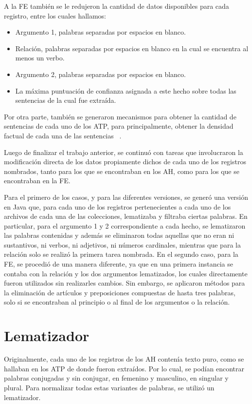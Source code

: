 A la FE tambi\'en se le redujeron la cantidad de datos disponibles para cada registro, entre los cuales hallamos:

\begin{itemize}
\item	Argumento 1, palabras separadas por espacios en blanco.
\item	Relaci\'on, palabras separadas por espacios en blanco en la cual se encuentra al menos un verbo.
\item	Argumento 2, palabras separadas por espacios en blanco.
\item	La m\'axima puntuaci\'on de confianza asignada a este hecho sobre todas las sentencias de la cual fue extra\'ida.
\end{itemize}

Por otra parte, tambi\'en se generaron mecanismos para obtener la cantidad de sentencias de cada uno de los ATP, para principalmente, obtener la densidad factual de cada una de las sentencias ~\cite{LeVoErFeCaHoGrr:12}.

Luego de finalizar el trabajo anterior, se continu\'o con tareas que involucraron la modificaci\'on directa de los datos propiamente dichos de cada uno de los registros nombrados, tanto para los que se encontraban en los AH, como para los que se encontraban en la FE.

Para el primero de los casos, y para las diferentes versiones, se gener\'o una versi\'on en Java que, para cada uno de los registros pertenecientes a cada uno de los archivos de cada una de las colecciones, lematizaba y filtraba ciertas palabras. En particular, para el argumento 1 y 2 correspondiente a cada hecho, se lematizaron las palabras contenidas y adem\'as se eliminaron todas aquellas que no eran ni sustantivos, ni verbos, ni adjetivos, ni n\'umeros cardinales,  mientras que para la relaci\'on solo se realiz\'o la primera tarea nombrada.
En el segundo caso, para la FE, se procedi\'o de una manera diferente, ya que en una primera instancia se contaba con la relaci\'on y los dos argumentos lematizados, los cuales directamente fueron utilizados sin realizarles cambios. Sin embargo, se aplicaron m\'etodos para la eliminaci\'on de art\'iculos y preposiciones compuestas de hasta tres palabras, solo si se encontraban al principio o al final de los argumentos o la relaci\'on.

\section{Lematizador}
Originalmente, cada uno de los registros de los AH conten\'ia texto puro, como se hallaban en los ATP de donde fueron extra\'idos. Por lo cual, se pod\'ian encontrar palabras conjugadas y sin conjugar, en femenino y masculino, en singular y plural. Para normalizar todas estas variantes de palabras, se utiliz\'o un lematizador.

